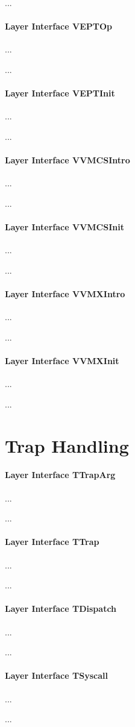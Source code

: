 ...

\paragraph{Layer Interface VEPTOp}
...

...

\paragraph{Layer Interface VEPTInit}
...

...

\paragraph{Layer Interface VVMCSIntro}
...

...

\paragraph{Layer Interface VVMCSInit}
...

...

\paragraph{Layer Interface VVMXIntro}
...

...

\paragraph{Layer Interface VVMXInit}
...

...

\section{Trap Handling}

\paragraph{Layer Interface TTrapArg}
...

...

\paragraph{Layer Interface TTrap}
...

...

\paragraph{Layer Interface TDispatch}
...

...

\paragraph{Layer Interface TSyscall}
...

...